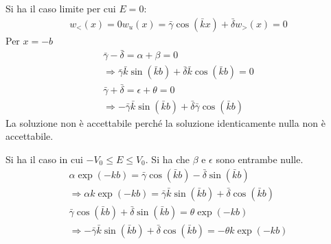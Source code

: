 Si ha il caso limite per cui $E=0$:
\begin{equation}\begin{split}
w_<\left(x\right)=0
w_u\left(x\right)=\bar \gamma\cos{\left(\bar kx\right)}+\bar \delta
w_>\left(x\right)=0
\end{split}\end{equation}
Per $x=-b$
\begin{equation}\begin{split}
\bar \gamma-\bar \delta=\alpha+\beta=0 \\
\Longrightarrow \bar \gamma\bar k\sin{\left(\bar kb\right)}+\bar \delta\bar k\cos{\left(\bar kb\right)}=0 \\
\bar \gamma+\bar \delta=\epsilon+\theta=0 \\
\Longrightarrow -\bar \gamma\bar k\sin{\left(\bar kb\right)}+\bar \delta\bar \gamma\cos{\left(\bar kb\right)}
\end{split}\end{equation}
La soluzione non è accettabile perché la soluzione identicamente nulla non è accettabile.

Si ha il caso in cui $-V_0\le E \le V_0$. Si ha che $\beta$ e $\epsilon$ sono entrambe nulle.
\begin{equation}\begin{split}
\alpha\exp{\left(-kb\right)}=\bar \gamma\cos{\left(\bar kb\right)}-\bar \delta\sin{\left(\bar kb\right)} \\
\Longrightarrow \alpha k \exp{\left(-kb\right)}=\bar \gamma\bar k\sin{\left(\bar kb\right)}+\bar \delta\cos{\left(\bar kb\right)} \\
\bar \gamma\cos{\left(\bar kb\right)}+\bar \delta\sin{\left(\bar kb\right)}=\theta\exp{\left(-kb\right)} \\
\Longrightarrow -\bar \gamma\bar k\sin{\left(\bar kb\right)}+\bar \delta\cos{\left(\bar kb\right)} =-\theta k\exp{\left(-kb\right)}
\end{split}\end{equation}

